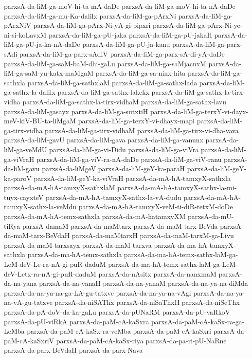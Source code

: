 {parxsA-da-liM-ga-moV-hi-ta-mA-daDe
parxsA-da-liM-ga-moV-hi-ta-nA-daDe
parxsA-da-liM-ga-mu-Ka-dalilx
parxsA-da-liM-ga-pArxNi
parxsA-da-liM-ga-pArxNiV
parxsA-da-liM-ga-pArx-Ni-yA-gi-pipxri
parxsA-da-liM-ga-pArx-Ni-ye-ni-si-koLavxM
parxsA-da-liM-ga-pU-jaka
parxsA-da-liM-ga-pU-jakaH
parxsA-da-liM-ga-pU-ja-ka-nA-daDe
parxsA-da-liM-ga-pU-ja-kanu
parxsA-da-liM-ga-parx-sAdi
parxsA-da-liM-ga-parx-sAdiV
parxsA-da-liM-ga-parx-sA-di-yA-daDe
parxsA-da-liM-ga-saM-baM-dhi-gaLu
parxsA-da-liM-ga-saMjacnxM
parxsA-da-liM-ga-saM-yu-katx-maMgaM
parxsA-da-liM-ga-sa-ninx-hita
parxsA-da-liM-ga-sathxla
parxsA-da-liM-ga-sathxlaM
parxsA-da-liM-ga-sathx-lada
parxsA-da-liM-ga-sathx-la-dalilx
parxsA-da-liM-ga-sathx-lakekx
parxsA-da-liM-ga-sathx-la-tirx-vidha
parxsA-da-liM-ga-sathx-la-tirx-vidhaM
parxsA-da-liM-ga-sathx-lavu
parxsA-da-liM-gasayx
parxsA-da-liM-ga-sutxtiH
parxsA-da-liM-ga-terxY-vi-dayx-meV-kiV-BU-ta-liMgaM
parxsA-da-liM-ga-terxY-vi-dhayx-mapi
parxsA-da-liM-ga-tirx-vidha
parxsA-da-liM-ga-tirx-vidhaM
parxsA-da-liM-ga-tirx-vi-dha-vava
parxsA-da-liM-gavU
parxsA-da-liM-gava
parxsA-da-liM-ga-vanunx
parxsA-da-liM-ga-veMdU
parxsA-da-liM-ga-vi-Didu
parxsA-da-liM-ga-viVra
parxsA-da-liM-ga-viVraH
parxsA-da-liM-ga-viV-ra-nA-daDe
parxsA-da-liM-ga-viV-ranu
parxsA-da-liM-gavu
parxsA-da-liMgeV
parxsA-da-liM-geY-ka-paraH
parxsA-da-liM-geY-ka-paroV
parxsA-da-liM-geY-ka-viVraH
parxsA-da-mA-hA-tamxyX-sathxla
parxsA-da-mA-hA-tamxyX-sathxlaM
parxsA-da-mA-hA-tamxyX-sathx-la-mi-tuyx-cayxteV
parxsA-da-mA-hA-tamxyX-sathx-la-vA-dudu
parxsA-da-mA-hA-tamxyX-sathx-la-veMdu
parxsA-da-mA-hA-tamxyX-veM-ti-diR-tetxM-doDe
parxsA-da-mA-hA-temx-sathxla
parxsA-da-mA-hatamxyXM
parxsA-da-mU-tiRya
parxsA-damaM
parxsA-da-maMtarx
parxsA-da-maM-tarx-BeVda
parxsA-da-maM-tarx-BeVdaH
parxsA-da-maMtarxH
parxsA-da-maM-tarxM-ga-Livu
parxsA-da-maM-tarxsayx
parxsA-da-maM-tarxva
parxsA-da-ma-hA-tamxyX-sathxla
parxsA-da-ma-hA-temx-sathxla
parxsA-da-ma-hA-temx-sathx-laM-ga-LeM-deV-Le-ra-nA-gi-puR-daduM
parxsA-da-ma-hA-temx-sathx-laM-ga-LeM-deV-Letx-ra-nA-gi-puR-daduM
parxsA-da-nAsitx
parxsA-da-nanxmaM
parxsA-da-na-yana
parxsA-da-na-yanaH
parxsA-da-na-yanaM
parxsA-da-na-ya-na-diMda
parxsA-da-na-ya-na-ga-LA-gu-tatxve
parxsA-da-na-ya-na-vAgi
parxsA-da-na-ya-na-vA-gu-tatxve
parxsA-da-niSAThx
parxsA-da-niSaThxH
parxsA-da-niSeThx
parxsA-da-pA-doV-da-ka-gaLu
parxsA-da-pUNaRM
parxsA-da-pU-vaRkoV
parxsA-da-pU-viRkA
parxsA-da-paM-cA-kaSxra
parxsA-da-paM-cA-kaSx-ra-ga-LeMba
parxsA-da-paM-cA-kaSx-ra-veMba
parxsA-da-paM-cA-kaSxri
parxsA-da-paM-cA-kaSxriV
parxsA-da-paM-cA-kaSx-riya
parxsA-da-pa-ri-pU-NaRne
parxsA-da-parx-BeVdaH
parxsA-da-parx-Nava
}

